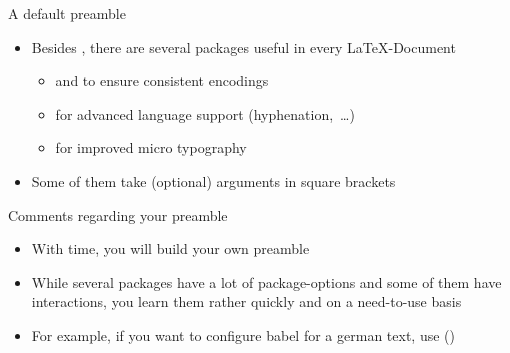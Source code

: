 \begin{frame}{A default preamble}
   \begin{itemize}
      \item Besides , there are several packages useful in every \LaTeX-Document
      \begin{itemize}
         \item {} and  to ensure consistent encodings
         \item {} for advanced language support (hyphenation,~\ldots)
         \item {} for improved micro typography
      \end{itemize}
      \item Some of them take (optional) arguments in square brackets
   \end{itemize}
\end{frame}

\begin{frame}{Comments regarding your preamble}
   \begin{itemize}
      \itemsep10pt
      \item With time, you will build your own preamble
      \item While several packages have a lot of package-options and some of them have interactions, you learn them rather quickly and on a need-to-use basis
      \item For example, if you want to configure babel for a german text, use  ()
   \end{itemize}
\end{frame}

